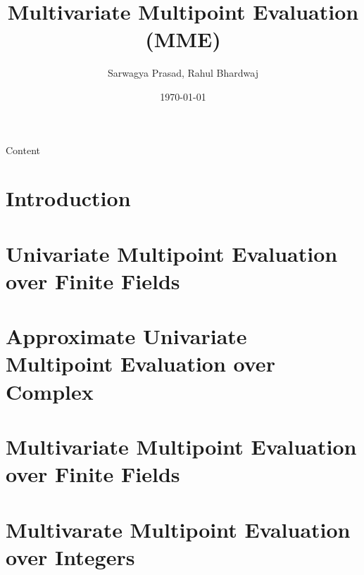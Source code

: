 \documentclass{beamer}
\title{Multivariate Multipoint Evaluation (MME)}
\author{Sarwagya Prasad, Rahul Bhardwaj}
\date{\today}
\begin{document}
\begin{frame}
\titlepage
\end{frame}

\begin{frame}{Content}
    \tableofcontents
\end{frame}
\section{Introduction}

\section{Univariate Multipoint Evaluation over Finite Fields}


\section{Approximate Univariate Multipoint Evaluation over Complex}


\section{Multivariate Multipoint Evaluation over Finite Fields}



\section{Multivarate Multipoint Evaluation over Integers}

\end{document}
